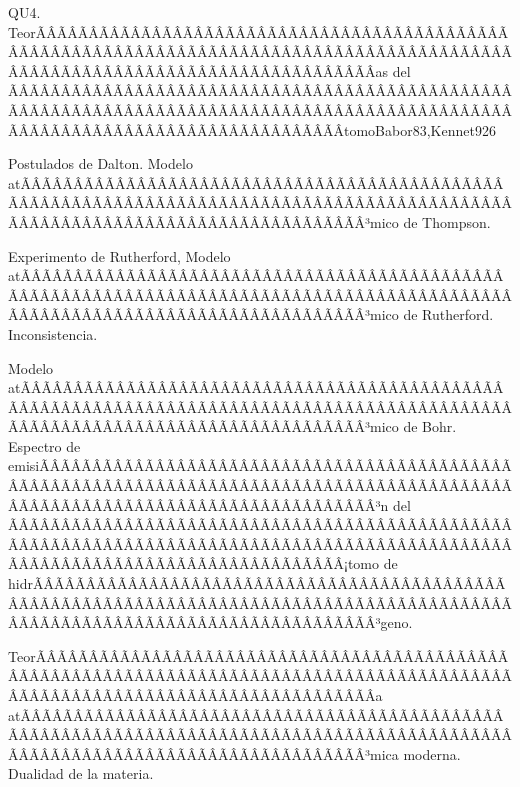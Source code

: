 \begin{sumilla}
\begin{unit}{QU4. TeorÃÂÃÂÃÂÃÂÃÂÃÂÃÂÃÂÃÂÃÂÃÂÃÂÃÂÃÂÃÂÃÂÃÂÃÂÃÂÃÂÃÂÃÂÃÂÃÂÃÂÃÂÃÂÃÂÃÂÃÂÃÂÃÂÃÂÃÂÃÂÃÂÃÂÃÂÃÂÃÂÃÂÃÂÃÂÃÂÃÂÃÂÃÂÃÂÃÂÃÂÃÂÃÂÃÂÃÂÃÂÃÂÃÂÃÂÃÂÃÂÃÂÃÂÃÂÃÂ­as del ÃÂÃÂÃÂÃÂÃÂÃÂÃÂÃÂÃÂÃÂÃÂÃÂÃÂÃÂÃÂÃÂÃÂÃÂÃÂÃÂÃÂÃÂÃÂÃÂÃÂÃÂÃÂÃÂÃÂÃÂÃÂÃÂÃÂÃÂÃÂÃÂÃÂÃÂÃÂÃÂÃÂÃÂÃÂÃÂÃÂÃÂÃÂÃÂÃÂÃÂÃÂÃÂÃÂÃÂÃÂÃÂÃÂÃÂÃÂÃÂÃÂÃÂÃÂÃÂtomo}{Babor83,Kennet92}{6}
\begin{topicos}
      \item Postulados de Dalton. Modelo atÃÂÃÂÃÂÃÂÃÂÃÂÃÂÃÂÃÂÃÂÃÂÃÂÃÂÃÂÃÂÃÂÃÂÃÂÃÂÃÂÃÂÃÂÃÂÃÂÃÂÃÂÃÂÃÂÃÂÃÂÃÂÃÂÃÂÃÂÃÂÃÂÃÂÃÂÃÂÃÂÃÂÃÂÃÂÃÂÃÂÃÂÃÂÃÂÃÂÃÂÃÂÃÂÃÂÃÂÃÂÃÂÃÂÃÂÃÂÃÂÃÂÃÂÃÂÃÂ³mico de Thompson.
      \item Experimento de Rutherford, Modelo atÃÂÃÂÃÂÃÂÃÂÃÂÃÂÃÂÃÂÃÂÃÂÃÂÃÂÃÂÃÂÃÂÃÂÃÂÃÂÃÂÃÂÃÂÃÂÃÂÃÂÃÂÃÂÃÂÃÂÃÂÃÂÃÂÃÂÃÂÃÂÃÂÃÂÃÂÃÂÃÂÃÂÃÂÃÂÃÂÃÂÃÂÃÂÃÂÃÂÃÂÃÂÃÂÃÂÃÂÃÂÃÂÃÂÃÂÃÂÃÂÃÂÃÂÃÂÃÂ³mico de Rutherford. Inconsistencia.
      \item Modelo atÃÂÃÂÃÂÃÂÃÂÃÂÃÂÃÂÃÂÃÂÃÂÃÂÃÂÃÂÃÂÃÂÃÂÃÂÃÂÃÂÃÂÃÂÃÂÃÂÃÂÃÂÃÂÃÂÃÂÃÂÃÂÃÂÃÂÃÂÃÂÃÂÃÂÃÂÃÂÃÂÃÂÃÂÃÂÃÂÃÂÃÂÃÂÃÂÃÂÃÂÃÂÃÂÃÂÃÂÃÂÃÂÃÂÃÂÃÂÃÂÃÂÃÂÃÂÃÂ³mico de Bohr. Espectro de emisiÃÂÃÂÃÂÃÂÃÂÃÂÃÂÃÂÃÂÃÂÃÂÃÂÃÂÃÂÃÂÃÂÃÂÃÂÃÂÃÂÃÂÃÂÃÂÃÂÃÂÃÂÃÂÃÂÃÂÃÂÃÂÃÂÃÂÃÂÃÂÃÂÃÂÃÂÃÂÃÂÃÂÃÂÃÂÃÂÃÂÃÂÃÂÃÂÃÂÃÂÃÂÃÂÃÂÃÂÃÂÃÂÃÂÃÂÃÂÃÂÃÂÃÂÃÂÃÂ³n del ÃÂÃÂÃÂÃÂÃÂÃÂÃÂÃÂÃÂÃÂÃÂÃÂÃÂÃÂÃÂÃÂÃÂÃÂÃÂÃÂÃÂÃÂÃÂÃÂÃÂÃÂÃÂÃÂÃÂÃÂÃÂÃÂÃÂÃÂÃÂÃÂÃÂÃÂÃÂÃÂÃÂÃÂÃÂÃÂÃÂÃÂÃÂÃÂÃÂÃÂÃÂÃÂÃÂÃÂÃÂÃÂÃÂÃÂÃÂÃÂÃÂÃÂÃÂÃÂ¡tomo de hidrÃÂÃÂÃÂÃÂÃÂÃÂÃÂÃÂÃÂÃÂÃÂÃÂÃÂÃÂÃÂÃÂÃÂÃÂÃÂÃÂÃÂÃÂÃÂÃÂÃÂÃÂÃÂÃÂÃÂÃÂÃÂÃÂÃÂÃÂÃÂÃÂÃÂÃÂÃÂÃÂÃÂÃÂÃÂÃÂÃÂÃÂÃÂÃÂÃÂÃÂÃÂÃÂÃÂÃÂÃÂÃÂÃÂÃÂÃÂÃÂÃÂÃÂÃÂÃÂ³geno.
      \item TeorÃÂÃÂÃÂÃÂÃÂÃÂÃÂÃÂÃÂÃÂÃÂÃÂÃÂÃÂÃÂÃÂÃÂÃÂÃÂÃÂÃÂÃÂÃÂÃÂÃÂÃÂÃÂÃÂÃÂÃÂÃÂÃÂÃÂÃÂÃÂÃÂÃÂÃÂÃÂÃÂÃÂÃÂÃÂÃÂÃÂÃÂÃÂÃÂÃÂÃÂÃÂÃÂÃÂÃÂÃÂÃÂÃÂÃÂÃÂÃÂÃÂÃÂÃÂÃÂ­a atÃÂÃÂÃÂÃÂÃÂÃÂÃÂÃÂÃÂÃÂÃÂÃÂÃÂÃÂÃÂÃÂÃÂÃÂÃÂÃÂÃÂÃÂÃÂÃÂÃÂÃÂÃÂÃÂÃÂÃÂÃÂÃÂÃÂÃÂÃÂÃÂÃÂÃÂÃÂÃÂÃÂÃÂÃÂÃÂÃÂÃÂÃÂÃÂÃÂÃÂÃÂÃÂÃÂÃÂÃÂÃÂÃÂÃÂÃÂÃÂÃÂÃÂÃÂÃÂ³mica moderna. Dualidad de la materia.

\end{topicos}
\end{unit}
\end{sumilla}
